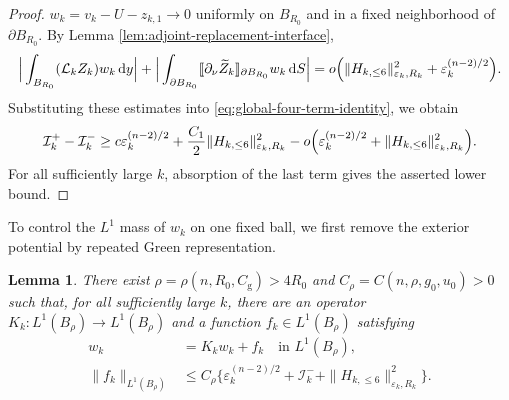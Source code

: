 \documentclass[11pt]{article}
\numberwithin{equation}{section}
\newtheorem{lemma}[theorem]{Lemma}
\theoremstyle{remark}
\newcommand{\dd}{\mathop{}\!\mathrm{d}}
\begin{document}
\begin{proof}
$w_k=v_k-U-z_{k,1}\to0$ uniformly on $B_{R_0}$ and in a fixed neighborhood
of $\partial B_{R_0}$.  By
Lemma  \ref{lem:adjoint-replacement-interface},
{
\[
 \Big|\int_{B_{R_0}}(\mathcal L_kZ_k)w_k\dd y\Big|
 +\Big|\int_{\partial B_{R_0}}
 \llbracket\partial_\nu\widetilde Z_k\rrbracket_{\partial B_{R_0}}w_k\dd S\Big|
 =o\Bigl(
 \|H_{k,\le6}\|_{\varepsilon_k,R_k}^2
 +\varepsilon_k^{(n-2)/2}\Bigr).
\]
}
Substituting these estimates into
\eqref{eq:global-four-term-identity}, we obtain
{
\[
 \mathcal I_k^+-\mathcal I_k^-
 \ge c\varepsilon_k^{(n-2)/2}
 +\frac{C_1}{2}\|H_{k,\le6}\|_{\varepsilon_k,R_k}^2
 -o\Bigl(\varepsilon_k^{(n-2)/2}
 +\|H_{k,\le6}\|_{\varepsilon_k,R_k}^2\Bigr).
\]
}
For all sufficiently large $k$,  absorption of the last term gives the
asserted lower bound.
\end{proof}

 To control the $L^1$ mass of $w_k$ on one fixed ball, we first remove
the exterior potential by repeated Green representation.

 \begin{lemma} \label{lem:green-iteration}
There exist $\rho=\rho(n,R_0,C_{\mathrm g})>4R_0$ and
$C_\rho=C(n,\rho,g_0,u_0)>0$ such that, for all sufficiently large $k$,
there are an operator $K_k:L^1(B_\rho)\to L^1(B_\rho)$ and a function
$f_k\in L^1(B_\rho)$ satisfying
{
\[
\begin{aligned}
 w_k&=K_kw_k+f_k \quad \text{in }L^1(B_\rho),\\
 \|f_k\|_{L^1(B_\rho)}
 &\le C_\rho\big\{
 \varepsilon_k^{(n-2)/2}+\mathcal I_k^-
 +\|H_{k,\le6}\|_{\varepsilon_k,R_k}^2\big\}.
\end{aligned}
\]
}
 \end{lemma}
\end{document}
